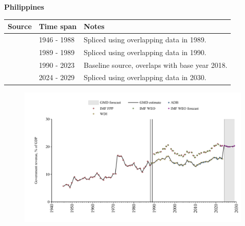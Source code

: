\documentclass[12pt,a4paper,landscape]{article}
\begin{document}
\begin{adjustbox}{max totalsize={\paperwidth}{\paperheight},center}
\begin{minipage}[t][\textheight][t]{\textwidth}
\vspace*{0.5cm}
{}
\begin{center}
{\Large\bfseries Philippines}
\end{center}
\vspace{0.5cm}
\begin{table}[H]
\centering
\small
\begin{tabular}{|l|l|l|}
\hline
\textbf{Source} & \textbf{Time span} & \textbf{Notes} \\
\hline
\rowcolor{white}\cite{IMF_FPP}& 1946 - 1988 &Spliced using overlapping data in 1989.\\
\rowcolor{lightgray}\cite{IMF_WEO}& 1989 - 1989 &Spliced using overlapping data in 1990.\\
\rowcolor{white}\cite{WDI}& 1990 - 2023 &Baseline source, overlaps with base year 2018.\\
\rowcolor{lightgray}\cite{IMF_WEO_forecast}& 2024 - 2029 &Spliced using overlapping data in 2030.\\
\hline
\end{tabular}
\end{table}
\begin{figure}[H]
\centering
\includegraphics[width=\textwidth,height=0.6\textheight,keepaspectratio]{graphs/PHL_govrev_GDP.pdf}
\end{figure}
\end{minipage}
\end{adjustbox}
\end{document}
